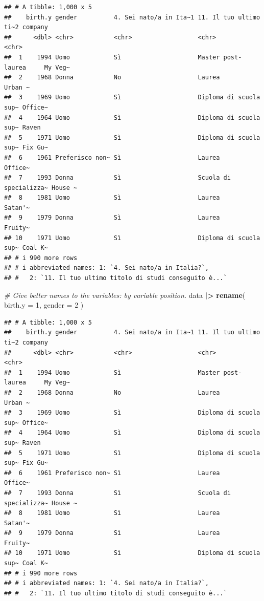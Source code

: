 \documentclass[
]{book}
\newenvironment{Shaded}{\begin{snugshade}}{\end{snugshade}}
\newcommand{\AttributeTok}[1]{\textcolor[rgb]{0.13,0.29,0.53}{#1}}
\newcommand{\CommentTok}[1]{\textcolor[rgb]{0.56,0.35,0.01}{\textit{#1}}}
\newcommand{\DecValTok}[1]{\textcolor[rgb]{0.00,0.00,0.81}{#1}}
\newcommand{\FunctionTok}[1]{\textcolor[rgb]{0.13,0.29,0.53}{\textbf{#1}}}
\newcommand{\NormalTok}[1]{#1}
\newcommand{\SpecialCharTok}[1]{\textcolor[rgb]{0.81,0.36,0.00}{\textbf{#1}}}
\begin{document}
\begin{verbatim}
## # A tibble: 1,000 x 5
##    birth.y gender          4. Sei nato/a in Ita~1 11. Il tuo ultimo ti~2 company
##      <dbl> <chr>           <chr>                  <chr>                  <chr>  
##  1    1994 Uomo            Sì                     Master post-laurea     My Veg~
##  2    1968 Donna           No                     Laurea                 Urban ~
##  3    1969 Uomo            Sì                     Diploma di scuola sup~ Office~
##  4    1964 Uomo            Sì                     Diploma di scuola sup~ Raven  
##  5    1971 Uomo            Sì                     Diploma di scuola sup~ Fix Gu~
##  6    1961 Preferisco non~ Sì                     Laurea                 Office~
##  7    1993 Donna           Sì                     Scuola di specializza~ House ~
##  8    1981 Uomo            Sì                     Laurea                 Satan'~
##  9    1979 Donna           Sì                     Laurea                 Fruity~
## 10    1971 Uomo            Sì                     Diploma di scuola sup~ Coal K~
## # i 990 more rows
## # i abbreviated names: 1: `4. Sei nato/a in Italia?`,
## #   2: `11. Il tuo ultimo titolo di studi conseguito è...`
\end{verbatim}

\begin{Shaded}
\begin{Highlighting}[]
\CommentTok{\# Give better names to the variables: by variable position.}
\NormalTok{data }\SpecialCharTok{|\textgreater{}} 
  \FunctionTok{rename}\NormalTok{(}
    \AttributeTok{birth.y =} \DecValTok{1}\NormalTok{,}
    \AttributeTok{gender =} \DecValTok{2}
\NormalTok{  )}
\end{Highlighting}
\end{Shaded}

\begin{verbatim}
## # A tibble: 1,000 x 5
##    birth.y gender          4. Sei nato/a in Ita~1 11. Il tuo ultimo ti~2 company
##      <dbl> <chr>           <chr>                  <chr>                  <chr>  
##  1    1994 Uomo            Sì                     Master post-laurea     My Veg~
##  2    1968 Donna           No                     Laurea                 Urban ~
##  3    1969 Uomo            Sì                     Diploma di scuola sup~ Office~
##  4    1964 Uomo            Sì                     Diploma di scuola sup~ Raven  
##  5    1971 Uomo            Sì                     Diploma di scuola sup~ Fix Gu~
##  6    1961 Preferisco non~ Sì                     Laurea                 Office~
##  7    1993 Donna           Sì                     Scuola di specializza~ House ~
##  8    1981 Uomo            Sì                     Laurea                 Satan'~
##  9    1979 Donna           Sì                     Laurea                 Fruity~
## 10    1971 Uomo            Sì                     Diploma di scuola sup~ Coal K~
## # i 990 more rows
## # i abbreviated names: 1: `4. Sei nato/a in Italia?`,
## #   2: `11. Il tuo ultimo titolo di studi conseguito è...`
\end{verbatim}
\end{document}
